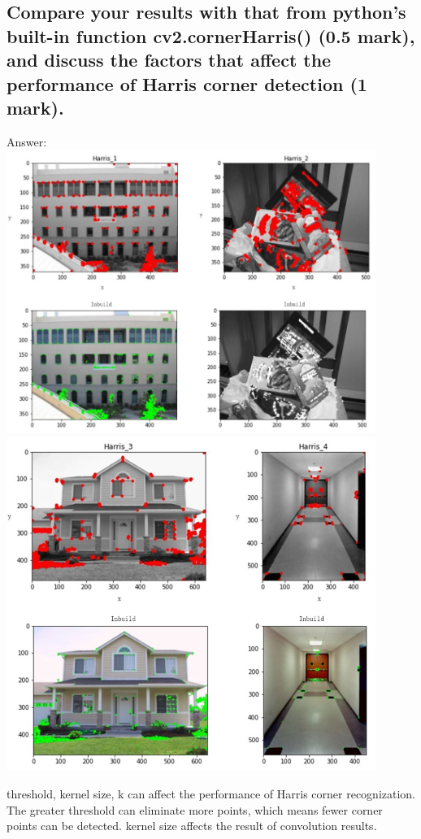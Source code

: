 \documentclass[]{article}
\begin{document}
\subsection{Compare your results with that from python’s built-in function cv2.cornerHarris() (0.5 mark), and discuss the factors that affect the performance of Harris corner detection (1 mark).}
Answer:\\
\includegraphics[width=12cm]{fig2.png}\\
\includegraphics[width=12cm]{fig3.png}

threshold, kernel size, k can affect the performance of Harris corner recognization. The greater threshold can eliminate more points, which means fewer corner points can be detected. kernel size affects the result of convolution results.
\end{document}
